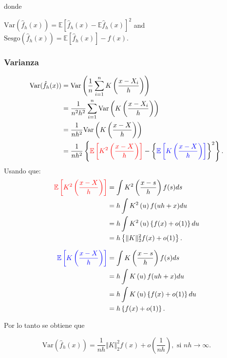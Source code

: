 \documentclass[12pt]{book}\usepackage[]{graphicx}\usepackage[]{color}
\theoremstyle{definition}
\theoremstyle{plain}
\begin{document}
donde

\(\mathrm{Var}\left(\hat{f}_{h}(x)\right)=\mathbb{E}\left[\hat{f}_{h}(x)-\mathbb{E}\hat{f}_{h}(x)\right]^{2}\) and \(\mathrm{Sesgo}\left(\hat{f}_{h}(x)\right)=\mathbb{E}\left[\hat{f}_{h}(x)\right]-f(x)\).

\newpage

\subsubsection{Varianza}

\begin{align*}
	\mathrm{Var}(\hat{f}_{h}(x))
	  & =\mathrm{Var}\left(\frac{1}{n}\sum_{i=1}^{n}K\left(\frac{x-X_{i}}{h}\right)\right)          \\
	  & =\frac{1}{n^{2}h^{2}}\sum_{i=1}^{n}\mathrm{Var}\left(K\left(\frac{x-X_{i}}{h}\right)\right) \\
	  & =\frac{1}{nh^{2}}\mathrm{Var}\left(K\left(\frac{x-X}{h}\right)\right)                       \\
	  & =\frac{1}{nh^{2}}\left\{
	\textcolor{red}{\mathbb{E}\left[K^{2}\left(\frac{x-X}{h}\right)\right]}
	-\left\{
	\textcolor{blue}{\mathbb{E}\left[K\left(\frac{x-X}{h}\right)\right]}
	\right\}^{2}
	\right\}.
\end{align*}
Usando que:
\begin{align*}
	\textcolor{red}{\mathbb{E}\left[K^{2}\left(\frac{x-X}{h}\right)\right]}
	  & =\int K^{2}\left(\frac{x-s}{h}\right)f(s)ds            \\
	  & =h\int K^{2}\left(u\right)f(uh+x)du                    \\
	  & =h\int K^{2}\left(u\right)\left\{ f(x)+o(1)\right\} du \\
	  & =h\left\{ \Vert K\Vert_{2}^{2}f(x)+o(1)\right\} .
\end{align*}

\begin{align*}
	\textcolor{blue}{\mathbb{E}\left[K\left(\frac{x-X}{h}\right)\right]}
	  & =\int K\left(\frac{x-s}{h}\right)f(s)ds            \\
	  & =	h\int K\left(u\right)f(uh+x)du                    \\
	  & =h\int K\left(u\right)\left\{ f(x)+o(1)\right\} du \\
	  & =h\left\{f(x)+o(1)\right\} .
\end{align*}

Por lo tanto se obtiene que

\begin{equation*}
	\mathrm{Var}\left(\hat{f}_{h}(x)\right) = \frac{1}{nh} \Vert K\Vert_{2}^{2}f(x) + o\left(\frac{1}{nh}\right), \text{ si } nh\to \infty.
\end{equation*}
\end{document}
